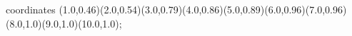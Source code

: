 					coordinates { (1.0,0.46)(2.0,0.54)(3.0,0.79)(4.0,0.86)(5.0,0.89)(6.0,0.96)(7.0,0.96)(8.0,1.0)(9.0,1.0)(10.0,1.0)};